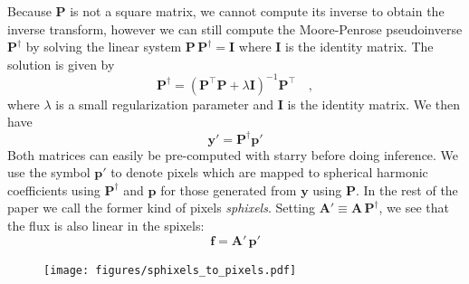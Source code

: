 \documentclass[modern]{aastex62}
\begin{document}
Because $\mathbf{P}$ is not a square matrix, we cannot compute its inverse to obtain the inverse transform, however we can still compute the Moore-Penrose pseudoinverse $\mathbf{P}^\dagger$ by solving the linear system $\mathbf{P}\,\mathbf{P}^\dagger=\mathbf{I}$ where $\mathbf{I}$ is the identity matrix. 
The solution is given by
\begin{equation}
\mathbf{P}^\dagger=\left(\mathbf{P}^{\top} \mathbf{P}+\lambda \mathbf{I}\right)^{-1} \mathbf{P}^{\top}
    \quad,
\end{equation}
where $\lambda$ is a small regularization parameter and $\mathbf{I}$ is the identity matrix.
We then have 
\begin{equation}
    \mathbf{y}'=\mathbf{P}^\dagger\mathbf{p}'
\end{equation}
Both matrices can easily be pre-computed with \textsf{starry} before doing inference.
We use the symbol $\mathbf{p}'$ to denote pixels which are mapped to spherical harmonic coefficients using $\mathbf{P}^\dagger$ and $\mathbf{p}$ for those generated from $\mathbf{y}$ using $\mathbf{P}$.
In the rest of the paper we call the former kind of pixels \emph{sphixels}.
Setting $\mathbf{A}'\equiv \mathbf{A}\,\mathbf{P}^\dagger$, we see that the flux is also linear in the spixels:
\begin{equation}
    \mathbf{f}=\mathbf{A}'\,\mathbf{p}'
    \label{eq:linear_model_pix}
\end{equation}

\begin{figure}[h!]
    \begin{centering}
    \texttt{[image: figures/sphixels\_to\_pixels.pdf]}
    \end{centering}
\end{figure}
\end{document}
